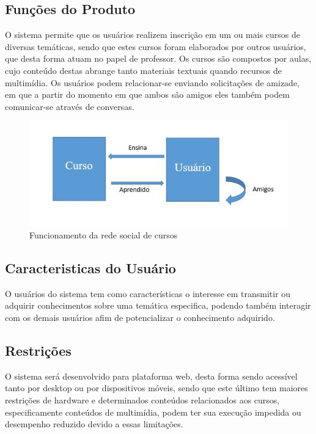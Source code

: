 \documentclass[12pt,a4paper,onecolumn,titlepage]{article}
\begin{document}
\subsection{Funções do Produto}


O sistema permite que os usuários realizem inscrição em um ou mais cursos de diversas temáticas, sendo que estes cursos foram elaborados por outros usuários, que desta forma atuam no papel de professor. Os cursos são compostos por aulas, cujo conteúdo destas abrange tanto materiais textuais quando recursos de multimídia. Os usuários podem relacionar-se enviando solicitações de amizade, em que a partir do momento em que ambos são amigos eles também podem comunicar-se através de conversas.


\begin{figure}[!htb]
  \centering
  \includegraphics[scale=0.7]{figura1.png}
  \caption{Funcionamento da rede social de cursos}
  \label{figRotulo}
\end{figure}


\subsection{Caracteristicas do Usuário}

O usuários do sistema tem como características o interesse em transmitir ou adquirir conhecimentos sobre uma temática especifica, podendo também interagir com os demais usuários afim de potencializar o conhecimento adquirido.

\subsection{Restrições}

O sistema será desenvolvido para plataforma web, desta forma sendo acessível tanto por desktop ou por dispositivos móveis, sendo que este último tem maiores restrições de hardware e determinados conteúdos relacionados aos cursos, especificamente conteúdos de multimídia, podem ter sua execução impedida ou desempenho reduzido devido a essas limitações.
\end{document}
